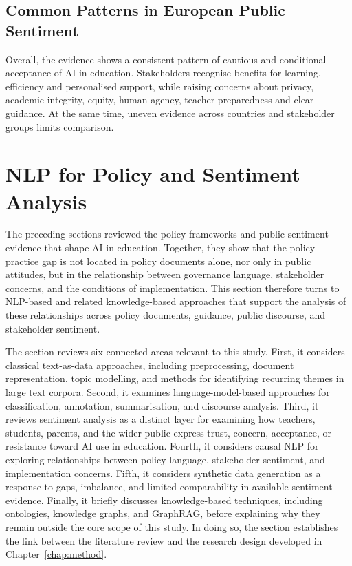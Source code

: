 \subsection*{Common Patterns in European Public Sentiment}

Overall, the evidence shows a consistent pattern of cautious and conditional
acceptance of AI in education. Stakeholders recognise benefits for learning,
efficiency and personalised support, while raising concerns about privacy, academic
integrity, equity, human agency, teacher preparedness and clear guidance. At the same
time, uneven evidence across countries and stakeholder groups limits comparison.

\section{NLP for Policy and Sentiment Analysis}
\label{c1:nlpsa}

The preceding sections reviewed the policy frameworks and public sentiment evidence
that shape AI in education. Together, they show that the policy--practice gap is not
located in policy documents alone, nor only in public attitudes, but in the
relationship between governance language, stakeholder concerns, and the conditions of
implementation. This section therefore turns to NLP-based and related knowledge-based
approaches that support the analysis of these relationships across policy documents,
guidance, public discourse, and stakeholder sentiment.

The section reviews six connected areas relevant to this study. First, it considers
classical text-as-data approaches, including preprocessing, document representation,
topic modelling, and methods for identifying recurring themes in large text corpora.
Second, it examines language-model-based approaches for classification, annotation,
summarisation, and discourse analysis. Third, it reviews sentiment analysis as a
distinct layer for examining how teachers, students, parents, and the wider public
express trust, concern, acceptance, or resistance toward AI use in education. Fourth,
it considers causal NLP for exploring relationships between policy language,
stakeholder sentiment, and implementation concerns. Fifth, it considers synthetic
data generation as a response to gaps, imbalance, and limited comparability in
available sentiment evidence. Finally, it briefly discusses knowledge-based
techniques, including ontologies, knowledge graphs, and GraphRAG, before explaining
why they remain outside the core scope of this study. In doing so, the section
establishes the link between the literature review and the research design developed
in Chapter~\ref{chap:method}.

